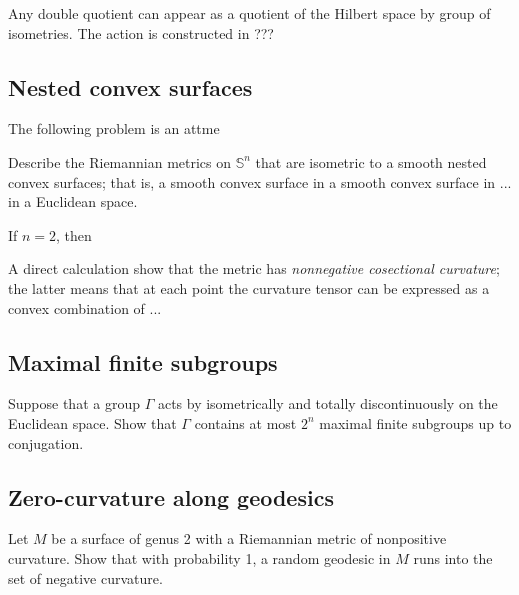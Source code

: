 Any double quotient can appear as a quotient of the Hilbert space by group of isometries.
The action is constructed in ???

\subsection*{Nested convex surfaces}

The following problem is an attme

\begin{pr}
Describe the Riemannian metrics on $\mathbb{S}^n$ that are isometric to a smooth nested convex surfaces;
that is, a smooth convex surface in a smooth convex surface in ... in a Euclidean space.
\end{pr}

If $n=2$, then 

A direct calculation show that the metric has \emph{nonnegative cosectional curvature};
the latter means that at each point the curvature tensor can be expressed as a convex combination of ...

\subsection*{Maximal finite subgroups}

\begin{pr}
Suppose that a group $\Gamma$ acts by isometrically and totally discontinuously on the Euclidean space.
Show that $\Gamma$ contains at most $2^n$ maximal finite subgroups up to conjugation.
\end{pr}

\subsection*{Zero-curvature along geodesics}

\begin{pr}
Let $M$ be a surface of genus 2 with a Riemannian metric of nonpositive curvature.
Show that with probability 1, a random geodesic in $M$ runs into the set of negative curvature.
\end{pr}



